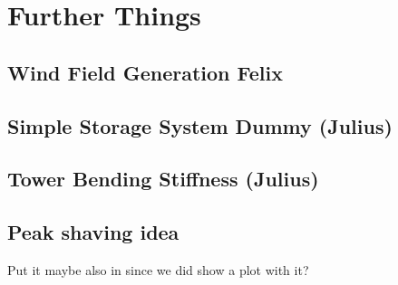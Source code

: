 \chapter{Further Things}
\section{Wind Field Generation Felix}

\section{Simple Storage System Dummy (Julius)}


\section{Tower Bending Stiffness (Julius)}


\section{Peak shaving idea}
Put it maybe also in since we did show a plot with it?

